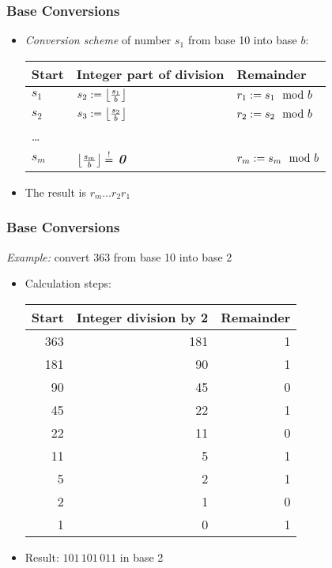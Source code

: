 \documentclass[%
  final,
  11pt, 
  show notes, %
  t, %
  fleqn, %
]{beamer}
\begin{document}
\begin{frame}
  \frametitle{Base Conversions}
\begin{itemize}
\item \emph{Conversion scheme} of number $s_1$ from base 10 into base $b$:\\
\vspace*{0.3cm}
{\renewcommand{\arraystretch}{1.5}
\begin{tabular}{lll}
\textbf{Start} & \textbf{Integer part of division} & \textbf{Remainder} \\ \midrule
$s_1$ & $s_2 := \left\lfloor \frac{s_1}{b} \right\rfloor$ & $r_1 := s_1 \mod b$ \\
$s_2$ & $s_3 := \left\lfloor \frac{s_2}{b} \right\rfloor$ & $r_2 := s_2 \mod b$ \\
\ldots \\
$s_m$ & $\left\lfloor \frac{s_m}{b} \right\rfloor \stackrel{!}{=} $ \textbf{\emph{0}} & $r_m := s_m \mod b$
\end{tabular}%
}

\vspace*{0.3cm}
\item The result is $r_m \ldots r_2 r_1$
\end{itemize}
\end{frame}

\begin{frame}
  \frametitle{Base Conversions}
\emph{Example:} convert 363 from base 10 into base 2
\begin{itemize}
\item Calculation steps: \\
\vspace*{0.3cm}
\begin{tabular}{rrr}
\textbf{Start} & \textbf{Integer division by 2} & \textbf{Remainder} \\ \midrule
363 & 181 & 1 \\
181 & 90 & 1 \\
90 & 45 & 0 \\
45 & 22 & 1 \\
22 & 11 & 0 \\
11 & 5 & 1 \\
5 & 2 & 1\\
2 & 1 & 0 \\
1 & 0 & 1 
\end{tabular}
\vspace*{0.3cm}
\item Result: $101\,101\,011$ in base 2
\end{itemize}
\end{frame}
\end{document}
